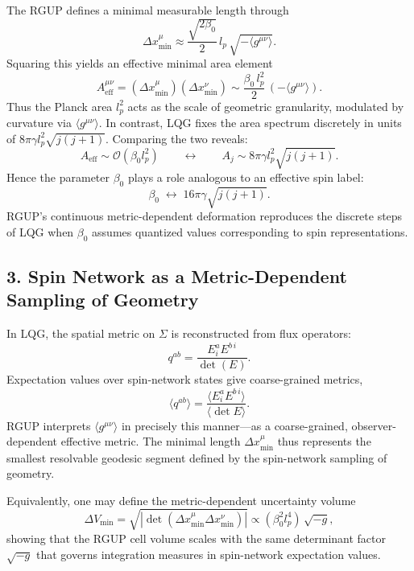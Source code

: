 \documentclass[11pt,oneside]{book}
\numberwithin{equation}{chapter}
\begin{document}
The RGUP defines a minimal measurable length through
\begin{equation}
\Delta x_{\min}^{\mu} \approx
\frac{\sqrt{2\beta_0}}{2}\,l_p\,\sqrt{-\langle g^{\mu\nu}\rangle}.
\end{equation}
Squaring this yields an effective minimal area element
\begin{equation}
A_{\text{eff}}^{\mu\nu} 
= (\Delta x_{\min}^{\mu})(\Delta x_{\min}^{\nu})
\sim \frac{\beta_0\,l_p^2}{2}\,(-\langle g^{\mu\nu}\rangle).
\end{equation}
Thus the Planck area $l_p^2$ acts as the scale of geometric granularity, modulated by curvature via $\langle g^{\mu\nu}\rangle$.  
In contrast, LQG fixes the area spectrum discretely in units of $8\pi\gamma l_p^2 \sqrt{j(j+1)}$.  
Comparing the two reveals:
\begin{equation}
A_{\text{eff}} \sim \mathcal{O}(\beta_0 l_p^2)
\qquad\leftrightarrow\qquad
A_j \sim 8\pi\gamma l_p^2 \sqrt{j(j+1)}.
\end{equation}
Hence the parameter $\beta_0$ plays a role analogous to an effective spin label:
\begin{equation}
\beta_0 \;\longleftrightarrow\;
16\pi\gamma \sqrt{j(j+1)}.
\end{equation}
RGUP’s continuous metric-dependent deformation reproduces the discrete steps of LQG when $\beta_0$ assumes quantized values corresponding to spin representations.

\subsection*{3. Spin Network as a Metric-Dependent Sampling of Geometry}

In LQG, the spatial metric on $\Sigma$ is reconstructed from flux operators:
\begin{equation}
q^{ab} = \frac{E^a_i E^{b\,i}}{\det(E)}.
\end{equation}
Expectation values over spin-network states give coarse-grained metrics,
\begin{equation}
\langle q^{ab}\rangle = 
\frac{\langle E^a_i E^{b\,i}\rangle}{\langle \det E\rangle}.
\end{equation}
RGUP interprets $\langle g^{\mu\nu}\rangle$ in precisely this manner—as a coarse-grained, observer-dependent effective metric.  
The minimal length $\Delta x_{\min}^\mu$ thus represents the smallest resolvable geodesic segment defined by the spin-network sampling of geometry.

Equivalently, one may define the metric-dependent uncertainty volume
\begin{equation}
\Delta V_{\min} = \sqrt{|\det(\Delta x_{\min}^\mu \Delta x_{\min}^\nu)|}
\propto (\beta_0^{2} l_p^4)\,\sqrt{-g},
\end{equation}
showing that the RGUP cell volume scales with the same determinant factor $\sqrt{-g}$ that governs integration measures in spin-network expectation values.
\end{document}
